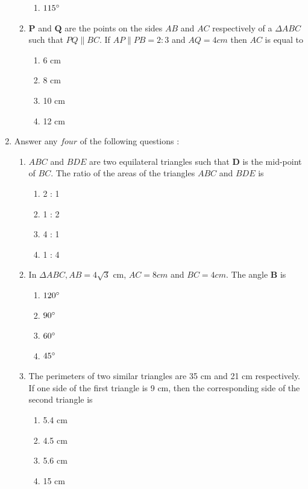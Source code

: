 \documentclass{article}
\let\vec\mathbf
\begin{document}
\begin{enumerate}
\begin{enumerate}
\begin{enumerate}
					\item $ 115{\degree} $
				\end{enumerate}
			\item $ \vec{P} $ and $ \vec{Q} $ are the points on the sides $ AB $ and $ AC $ 
				respectively of a 
				$ \Delta ABC $ such that $ PQ \parallel BC $. If $ AP \parallel PB = 2 : 3 $ and 
				$ AQ = 4 cm $ then $ AC $ is equal to
				\begin{enumerate}
					\item 6 cm 
					\item 8 cm
					\item 10 cm
					\item 12 cm
				\end{enumerate}
		\end{enumerate}
	\item Answer any $ four $ of the following questions :
		\begin{enumerate}
			\item $ ABC $ and $ BDE $ are two equilateral triangles such that $ \vec{D} $ 
				is the mid-point of $ BC $. The ratio of the areas of the triangles 
				$ ABC $ and $ BDE $ is
				\begin{enumerate}
					\item 2 : 1
					\item 1 : 2
					\item 4 : 1
					\item 1 : 4
				\end{enumerate}
			\item In $ \Delta ABC, AB = 4 \sqrt{3} $ cm, $ AC = 8 cm $ and $ BC = 4 cm $. The angle 
				$ \vec{B} $ is
				\begin{enumerate}
					\item $ 120{\degree} $
					\item $ 90{\degree} $
					\item $ 60{\degree} $
					\item $ 45{\degree} $
				\end{enumerate}
			\item The perimeters of two similar triangles are 35 cm and 21 cm respectively. If one 
				side of the first triangle is 9 cm, then the corresponding side of the second 
				triangle is
				\begin{enumerate}
					\item 5.4 cm
					\item 4.5 cm
					\item 5.6 cm
					\item 15 cm

\end{enumerate}
\end{enumerate}
\end{enumerate}
\end{document}
